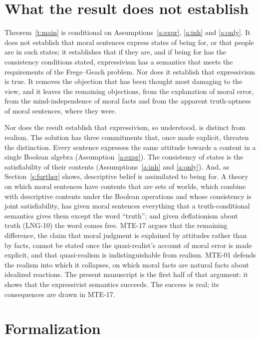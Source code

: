 \documentclass{situationist-preprint}
\begin{document}
\section{What the result does not establish}\label{s:limits}

Theorem~\ref{t:main} is conditional on Assumptions~\ref{a:expr}, \ref{a:inh} and \ref{a:only}. It does not establish that moral sentences express states of being for, or that people are in such states; it establishes that if they are, and if being for has the consistency conditions stated, expressivism has a semantics that meets the requirements of the Frege--Geach problem. Nor does it establish that expressivism is true. It removes the objection that has been thought most damaging to the view, and it leaves the remaining objections, from the explanation of moral error, from the mind-independence of moral facts and from the apparent truth-aptness of moral sentences, where they were.

Nor does the result establish that expressivism, so understood, is distinct from realism. The solution has three commitments that, once made explicit, threaten the distinction. Every sentence expresses the same attitude towards a content in a single Boolean algebra (Assumption~\ref{a:expr}). The consistency of states is the satisfiability of their contents (Assumptions~\ref{a:inh} and \ref{a:only}). And, as Section~\ref{s:further} shows, descriptive belief is assimilated to being for. A theory on which moral sentences have contents that are sets of worlds, which combine with descriptive contents under the Boolean operations and whose consistency is joint satisfiability, has given moral sentences everything that a truth-conditional semantics gives them except the word \enquote{truth}; and given deflationism about truth (LNG-10) the word comes free. MTE-17 argues that the remaining difference, the claim that moral judgment is explained by attitudes rather than by facts, cannot be stated once the quasi-realist's account of moral error is made explicit, and that quasi-realism is indistinguishable from realism. MTE-01 defends the realism into which it collapses, on which moral facts are natural facts about idealized reactions. The present manuscript is the first half of that argument: it shows that the expressivist semantics succeeds. The success is real; its consequences are drawn in MTE-17.

\section{Formalization}\label{s:formal}
\end{document}
